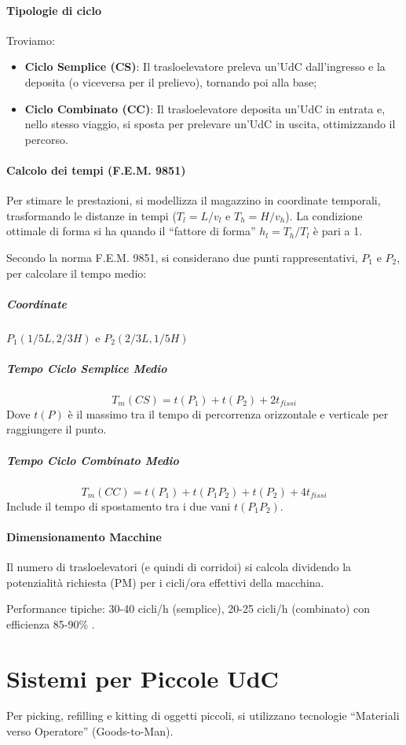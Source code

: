 \paragraph{Tipologie di ciclo} Troviamo:
\begin{itemize}
    \item \textbf{Ciclo Semplice (CS)}: Il trasloelevatore preleva un'UdC dall'ingresso e la deposita (o viceversa per il prelievo), tornando poi alla base;
    \item \textbf{Ciclo Combinato (CC)}: Il trasloelevatore deposita un'UdC in entrata e, nello stesso viaggio, si sposta per prelevare un'UdC in uscita, ottimizzando il percorso.
\end{itemize}

%
\paragraph{Calcolo dei tempi (F.E.M. 9851)}
Per stimare le prestazioni, si modellizza il magazzino in coordinate temporali, trasformando le distanze in tempi ($T_l = L/v_l$ e $T_h = H/v_h$). La condizione ottimale di forma si ha quando il ``fattore di forma'' $h_l = T_{h} / T_{l}$ è pari a 1.

Secondo la norma F.E.M. 9851, si considerano due punti rappresentativi, $P_{1}$ e $ P_{2} $, per calcolare il tempo medio:

%
\subparagraph{Coordinate} $P_1 (1/5 L, 2/3 H)$ e $P_2 (2/3 L, 1/5 H)$
%
\subparagraph{Tempo Ciclo Semplice Medio}
\[
    T_m(CS) = t(P_1) + t(P_2) + 2t_{fissi}
\]
Dove $t(P)$ è il massimo tra il tempo di percorrenza orizzontale e verticale per raggiungere il punto.
%
\subparagraph{Tempo Ciclo Combinato Medio}
\[
    T_m(CC) = t(P_1) + t(P_1P_2) + t(P_2) + 4t_{fissi}
\]
Include il tempo di spostamento tra i due vani $t(P_1P_2)$.

%
\paragraph{Dimensionamento Macchine} Il numero di trasloelevatori (e quindi di corridoi) si calcola dividendo la potenzialità richiesta (PM) per i cicli/ora effettivi della macchina.
\begin{example}
    Performance tipiche: 30-40 cicli/h (semplice), 20-25 cicli/h (combinato) con efficienza 85-90\% .
\end{example}

%
\section{Sistemi per Piccole UdC}
Per picking, refilling e kitting di oggetti piccoli, si utilizzano tecnologie ``Materiali verso Operatore'' (Goods-to-Man).
%
